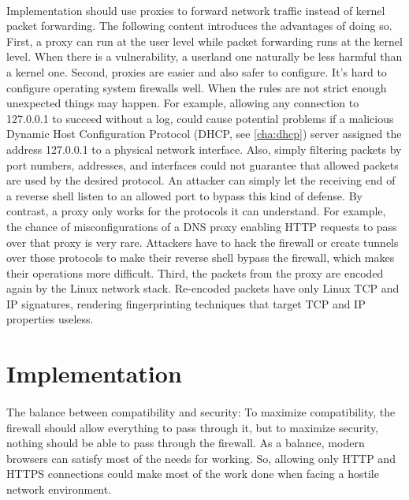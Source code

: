 \documentclass[mscthesis]{usiinfthesis}
\begin{document}
\paragraph{}
Implementation should use proxies to forward network traffic instead of kernel packet forwarding. The following content introduces the advantages of doing so. First, a proxy can run at the user level while packet forwarding runs at the kernel level. When there is a vulnerability, a userland one naturally be less harmful than a kernel one. Second, proxies are easier and also safer to configure. It's hard to configure operating system firewalls well. When the rules are not strict enough unexpected things may happen. For example, allowing any connection to 127.0.0.1 to succeed without a log, could cause potential problems if a malicious Dynamic Host Configuration Protocol (DHCP, see \cref{cha:dhcp}) server assigned the address 127.0.0.1 to a physical network interface. Also, simply filtering packets by port numbers, addresses, and interfaces could not guarantee that allowed packets are used by the desired protocol. An attacker can simply let the receiving end of a reverse shell listen to an allowed port to bypass this kind of defense. By contrast, a proxy only works for the protocols it can understand. For example, the chance of misconfigurations of a DNS proxy enabling HTTP requests to pass over that proxy is very rare. Attackers have to hack the firewall or create tunnels over those protocols to make their reverse shell bypass the firewall, which makes their operations more difficult. Third, the packets from the proxy are encoded again by the Linux network stack. Re-encoded packets have only Linux TCP and IP signatures, rendering fingerprinting techniques that target TCP and IP properties useless.

\section{Implementation}
\paragraph{}
The balance between compatibility and security: To maximize compatibility, the firewall should allow everything to pass through it, but to maximize security, nothing should be able to pass through the firewall. As a balance, modern browsers can satisfy most of the needs for working. So, allowing only HTTP and HTTPS connections could make most of the work done when facing a hostile network environment.
\end{document}
